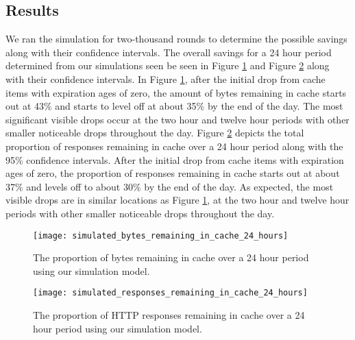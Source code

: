 \subsection*{Results}
We ran the simulation for two-thousand rounds to determine the possible savings along with their confidence intervals. The overall savings for a 24 hour period determined from our simulations seen be seen in Figure \ref{fig:simulated_bytes_remaining_in_cache_24_hours} and Figure \ref{fig:simulated_responses_remaining_in_cache_24_hours} along with their confidence intervals. In Figure \ref{fig:simulated_bytes_remaining_in_cache_24_hours}, after the initial drop from cache items with expiration ages of zero, the amount of bytes remaining in cache starts out at 43\% and starts to level off at about 35\% by the end of the day. The most significant visible drops occur at the two hour and twelve hour periods with other smaller noticeable drops throughout the day. Figure \ref{fig:simulated_responses_remaining_in_cache_24_hours} depicts the total proportion of responses remaining in cache over a 24 hour period along with the 95\% confidence intervals. After the initial drop from cache items with expiration ages of zero, the proportion of responses remaining in cache starts out at about 37\% and levels off to about 30\% by the end of the day. As expected, the most visible drops are in similar locations as Figure \ref{fig:simulated_bytes_remaining_in_cache_24_hours}, at the two hour and twelve hour periods with other smaller noticeable drops throughout the day.

\begin{figure}[]
	\centering
	\texttt{[image: simulated\_bytes\_remaining\_in\_cache\_24\_hours]}
	\caption{The proportion of bytes remaining in cache over a 24 hour period using our simulation model.}
	\label{fig:simulated_bytes_remaining_in_cache_24_hours}
\end{figure}

\begin{figure}[]
	\centering
	\texttt{[image: simulated\_responses\_remaining\_in\_cache\_24\_hours]}
	\caption{The proportion of HTTP responses remaining in cache over a 24 hour period using our simulation model.}
	\label{fig:simulated_responses_remaining_in_cache_24_hours}
\end{figure}

